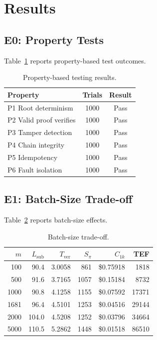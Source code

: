 \documentclass[journal]{IEEEtran}
\begin{document}
\section{Results}
\label{sec:results}



\subsection{E0: Property Tests}
Table~\ref{tab:property} reports property-based test outcomes.

\begin{table}[!t]
\centering
\caption{Property-based testing results.}
\label{tab:property}
\small
\begin{tabular}{@{}l c c@{}}
\toprule
\textbf{Property} & \textbf{Trials} & \textbf{Result} \\
\midrule
P1 Root determinism & 1000 & Pass \\
P2 Valid proof verifies & 1000 & Pass \\
P3 Tamper detection & 1000 & Pass \\
P4 Chain integrity & 1000 & Pass \\
P5 Idempotency & 1000 & Pass \\
P6 Fault isolation & 1000 & Pass \\
\bottomrule
\end{tabular}
\end{table}

\subsection{E1: Batch-Size Trade-off}
Table~\ref{tab:batch} reports batch-size effects.

\begin{table}[!t]
\centering
\caption{Batch-size trade-off.}
\label{tab:batch}
\small
\begin{tabular}{@{}r r r r r r@{}}
\toprule
$m$ & $L_{\mathrm{sub}}$ & $T_{\mathrm{ver}}$ & $S_{\pi}$ & $C_{1k}$ & TEF \\
\midrule
100 & 90.4 & 3.0058 & 861 & \$0.75918 & 1818 \\
500 & 91.6 & 3.7165 & 1057 & \$0.15184 & 8732 \\
1000 & 90.8 & 4.1258 & 1155 & \$0.07592 & 17371 \\
1681 & 96.4 & 4.5101 & 1253 & \$0.04516 & 29144 \\
2000 & 104.0 & 4.5208 & 1252 & \$0.03796 & 34664 \\
5000 & 110.5 & 5.2862 & 1448 & \$0.01518 & 86510 \\
\bottomrule
\end{tabular}
\end{table}
\end{document}
